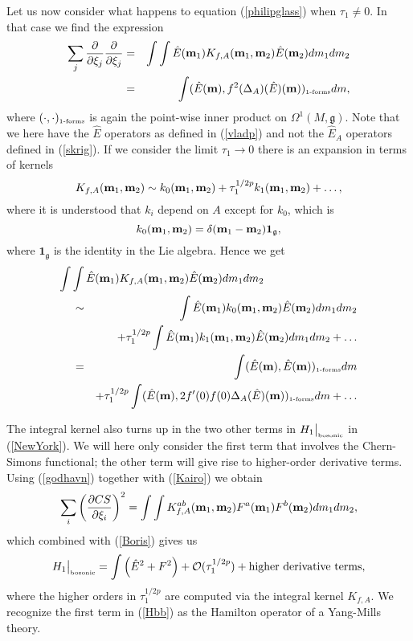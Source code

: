 \documentclass[letterpaper,11pt]{article}
\newcommand{\nn}{\nonumber}
\def\OO{\Omega}
\def\co{{\cal O}}
\newcommand{\pa}{\partial}
\begin{document}
Let us now consider what happens to equation (\ref{philipglass}) when $\tau_1\not=0$. In that case we find the expression
\begin{eqnarray*}
\sum_j \frac{\partial}{\partial \xi_j} \frac{\partial}{\partial \xi_j} 
 & = &\int \int  \hat{E}({\bf m}_1) K_{f,A}({\bf m}_1,{\bf m}_2) \hat{E}({\bf m}_2)dm_1 dm_2 \\
 &=& \int (\hat{E}({\bf m}), f^2 (\Delta_A)(\hat{E})({\bf m}))_{\mbox{\tiny 1-forms}} d m,
\end{eqnarray*}
where $(\cdot , \cdot )_{\mbox{\tiny 1-forms}}$ is again the point-wise inner product on $\OO^1(M,\mathfrak{g})$.
Note that we here have the $\hat{E}$ operators as defined in (\ref{vladp}) and not the $\hat{E}_A$ operators defined in (\ref{skrig}). If we consider the limit $\tau_1\to 0$ there is an expansion in terms of kernels
$$  K_{f,A}({\bf m}_1,{\bf m}_2) \sim k_0({\bf m}_1,{\bf m}_2)+\tau_1^{{1/2p}} k_1({\bf m}_1,{\bf m}_2)+\ldots ,$$
where it is understood that $k_i$ depend on $A$ except for $k_0$, which is 
$$
k_0({\bf m}_1,{\bf m}_2)=\delta({\bf m}_1 - {\bf m}_2)\mathbf{1}_{\mathfrak{g}},
$$ 
where $\mathbf{1}_\mathfrak{g}$
is the identity in the Lie algebra.
Hence we get 
\begin{eqnarray}
\int \int  \hat{E}({\bf m}_1) K_{f,A}({\bf m}_1,{\bf m}_2) \hat{E}({\bf m}_2)dm_1 dm_2 
\hspace{-6cm}&&\nn\\
&\sim& \int \hat{E} ({\bf m}_1) k_0({\bf m}_1,{\bf m}_2)\hat{E} ({\bf m}_2)dm_1dm_2
\nn\\&&
+\tau_1^{{1/2p}} \int \hat{E} ({\bf m}_1) k_1 ({\bf m}_1,{\bf m}_2)\hat{E} ({\bf m}_2) dm_1 dm_2+\ldots   \nn \\
&=&         \int (\hat{E} ({\bf m}) ,\hat{E} ({\bf m}))_{\mbox{\tiny 1-forms}}dm \nn
\\
&& +\tau_1^{{1/2p}} \int (\hat{E} ({\bf m}), 2f'(0)f(0)\Delta_A( \hat{E}) ({\bf m}))_{\mbox{\tiny 1-forms}} dm +\ldots    
\label{Boris}
\end{eqnarray} 







The integral kernel also turns up in the two other terms in $H_1\big\vert_{\mbox{\tiny bosonic}}$ in (\ref{NewYork}). We will here only consider the first term that involves the Chern-Simons functional; the other term will give rise to higher-order derivative terms. 
Using (\ref{godhavn}) together with (\ref{Kairo}) we obtain
\begin{eqnarray*}
\sum_i \left(\frac{\pa CS}{\pa \xi_i} \right)^2  =  \int \int  K^{ab}_{f,A}({\bf m}_1,{\bf m}_2) F^a({\bf m}_1) F^b({\bf m}_2)  dm_1 dm_2,
\end{eqnarray*}
which combined with (\ref{Boris}) gives us
\begin{equation}
H_1 \big\vert_{\mbox{\tiny bosonic}} = \int \left(\hat{E}^2   + F^2 \right) + \co(\tau_1^{{1/2p}}) + \mbox{higher derivative terms} ,
\label{Hbb}
\end{equation}
where the higher orders in $\tau_1^{{1/2p}}$ are computed via the integral kernel $K_{f,A}$. We recognize the first term in (\ref{Hbb}) as the Hamilton operator of a Yang-Mills theory.
\end{document}
